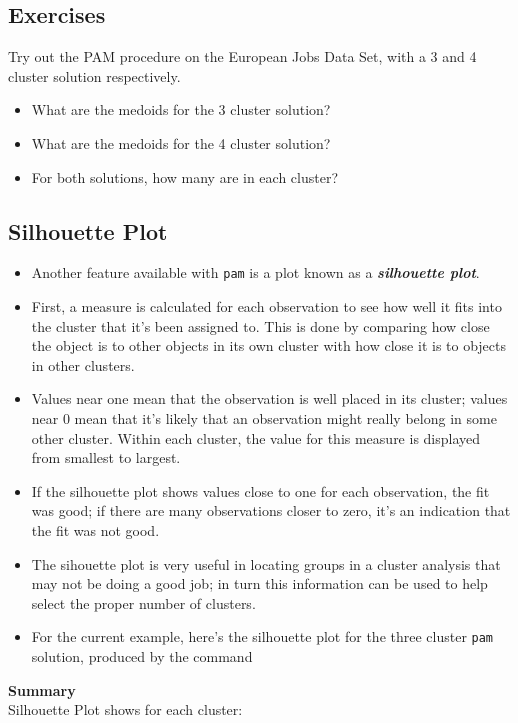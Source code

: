 \documentclass[12pt]{article}
\begin{document}
\subsection*{Exercises}
Try out the PAM procedure on the European Jobs Data Set, with a 3 and 4 cluster solution respectively.
\begin{itemize}
\item What are the medoids for the 3 cluster solution?
\item What are the medoids for the 4 cluster solution?
\item For both solutions, how many are in each cluster?
\end{itemize}
\newpage
\subsection*{Silhouette Plot}
\begin{itemize}
\item Another feature available with \texttt{pam} is a plot known as a \textbf{\textit{silhouette plot}}. 
\item First, a measure is calculated for each observation to see how well it fits into the cluster that it's been assigned to. 
This is done by comparing how close the object is to other objects in its own cluster with how close it is to objects in other clusters. 
\item Values near one mean that the observation is well placed in its cluster; values near 0 mean that it's likely that an observation might really belong in some other cluster. Within each cluster, the value for this measure is displayed from smallest to largest. 
\item If the silhouette plot shows values close to one for each observation, the fit was good; if there are many observations closer to zero, it's an indication that the fit was not good. 
\item The sihouette plot is very useful in locating groups in a cluster analysis that may not be doing a good job; in turn this information can be used to help select the proper number of clusters. 
\item For the current example, here's the silhouette plot for the three cluster \texttt{pam} solution, produced by the command
\end{itemize}
\bigskip
\noindent \textbf{Summary}\\
Silhouette Plot shows for each cluster:
\end{document}
